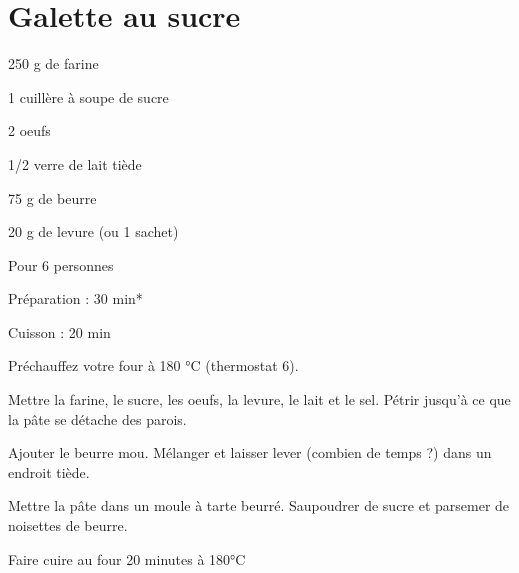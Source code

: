 \section{Galette au sucre}

\begin{ingredients}
\item 250 g de farine
\item 1 cuillère à soupe de sucre
\item 2 oeufs
\item 1/2 verre de lait tiède
\item 75 g de beurre
\item 20 g de levure (ou 1 sachet)
\end{ingredients}
\begin{infos}
\item Pour 6 personnes		%
\item Préparation : 30 min*		%
\item Cuisson : 20 min			%
\end{infos}
\begin{etapes}
\item Préchauffez votre four à 180 °C (thermostat 6).  
\item Mettre la farine, le sucre, les oeufs, la levure, le lait et le sel. Pétrir jusqu'à ce que la pâte se détache des parois.
\item Ajouter le beurre mou. Mélanger et laisser lever (combien de temps ?) dans un endroit tiède.
\item Mettre la pâte dans un moule à tarte beurré. Saupoudrer de sucre et parsemer de noisettes de beurre.
\item Faire cuire au four 20 minutes à 180°C
\end{etapes}
\begin{conseils}
\end{conseils}
